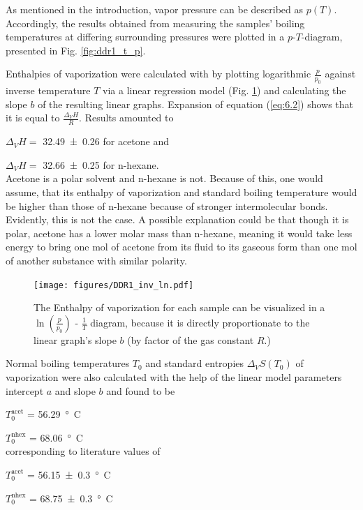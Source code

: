 {As mentioned in the introduction, vapor pressure can be described as $p(T)$. Accordingly, the results obtained from measuring the samples' boiling temperatures at differing surrounding pressures were plotted in a $p$-$T$-diagram, presented in Fig. \ref{fig:ddr1_t_p}.

Enthalpies of vaporization were calculated with by plotting logarithmic $\frac{p}{p_0}$ against inverse temperature $T$ via a linear regression model (Fig. \ref{fig:ddr1_inv_ln}) and calculating the slope $b$ of the resulting linear graphs. Expansion of equation (\ref{eq:6.2}) shows that it is equal to $\frac{\Delta_VH}{R}$. Results amounted to 

$\Delta_VH=$ \qty{32.49 \pm 0.26}{\kJpmole} for acetone and 

$\Delta_VH=$ \qty{32.66 \pm 0.25}{\kJpmole} for n-hexane. 
\\Acetone is a polar solvent and n-hexane is not. Because of this, one would assume, that its enthalpy of vaporization and standard boiling temperature would be higher than those of n-hexane because of stronger intermolecular bonds. Evidently, this is not the case. A possible explanation could be that though it is polar, acetone has a lower molar mass than n-hexane, meaning it would take less  energy to bring one mol of acetone from its fluid to its gaseous form than one mol of another substance with similar polarity.

 
\begin{figure}[H]
    \centering
    \texttt{[image: figures/DDR1\_inv\_ln.pdf]}
    \caption{The Enthalpy of vaporization for each sample can be visualized in a $\ln\left(\frac{p}{p_0}\right)$ - $\frac{1}{T}$ diagram, because it is directly proportionate to the linear graph's slope $b$ (by factor of the gas constant $R$.)}
    \label{fig:ddr1_inv_ln}
\end{figure}


Normal boiling temperatures $T_0$ and standard entropies $\Delta_VS(T_0)$ of vaporization were also calculated with the help of the linear model parameters intercept $a$ and slope $b$ and found to be 

$T_0^{\text{acet}}$ = \qty{56.29}{°C}  

$T_0^{\text{nhex}}$ = \qty{68.06}{°C}
\\corresponding to literature values of 

$T_0^{\text{acet}}$ = \qty{56.15 \pm 0.3}{°C} 

$T_0^{\text{nhex}}$ = \qty{68.75 \pm 0.3}{°C}

}
